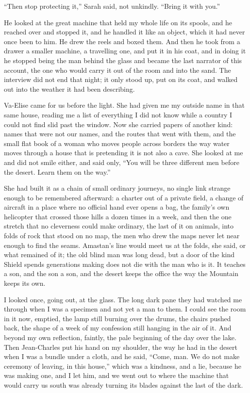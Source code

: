 ``Then stop protecting it,'' Sarah said, not unkindly. ``Bring it with you.''\par

He looked at the great machine that held my whole life on its spools, and he reached over and stopped it, and he handled it like an object, which it had never once been to him. He drew the reels and boxed them. And then he took from a drawer a smaller machine, a travelling one, and put it in his coat, and in doing it he stopped being the man behind the glass and became the last narrator of this account, the one who would carry it out of the room and into the sand. The interview did not end that night; it only stood up, put on its coat, and walked out into the weather it had been describing.\par

Va-Elise came for us before the light. She had given me my outside name in that same house, reading me a list of everything I did not know while a country I could not find slid past the window. Now she carried papers of another kind: names that were not our names, and the routes that went with them, and the small flat book of a woman who moves people across borders the way water moves through a house that is pretending it is not also a cave. She looked at me and did not smile either, and said only, ``You will be three different men before the desert. Learn them on the way.''\par

She had built it as a chain of small ordinary journeys, no single link strange enough to be remembered afterward: a charter out of a private field, a change of aircraft in a place where no official hand ever opens a bag, the family's own helicopter that crossed those hills a dozen times in a week, and then the one stretch that no cleverness could make ordinary, the last of it on animals, into folds of rock that stood on no map, the men who drew the maps never let near enough to find the seams. Amastan's line would meet us at the folds, she said, or what remained of it; the old blind man was long dead, but a door of the kind Shield spends generations making does not die with the man who is it. It teaches a son, and the son a son, and the desert keeps the office the way the Mountain keeps its own.\par

I looked once, going out, at the glass. The long dark pane they had watched me through when I was a specimen and not yet a man to them. I could see the room in it now, emptied, the lamp still burning over the drums, the chairs pushed back, the shape of a week of my confession still hanging in the air of it. And beyond my own reflection, faintly, the pale beginning of the day over the lake. Then Jean-Charles put his hand on my shoulder, the way he had in the desert when I was a bundle under a cloth, and he said, ``Come, man. We do not make ceremony of leaving, in this house,'' which was a kindness, and a lie, because he was making one, and I let him, and we went out to where the machine that would carry us south was already turning its blades against the last of the dark.\par
